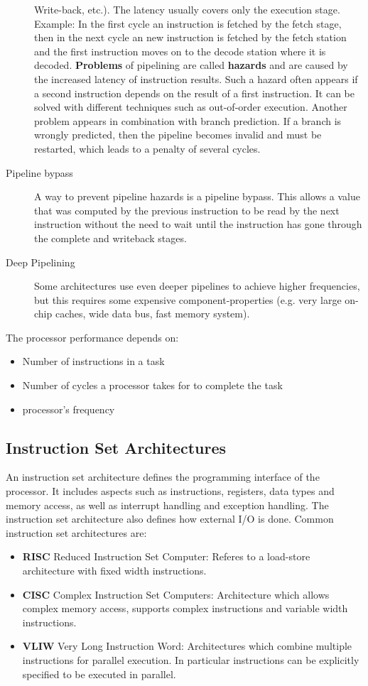 \documentclass[a4paper,10pt]{article}
\begin{document}
\begin{description}
Write-back, etc.)\cite{powerpc}. The latency usually covers only the execution stage. Example: In the first cycle an instruction is fetched by the
fetch stage, then in the next cycle an new instruction is fetched by the fetch station and the first instruction moves on to the decode
station where it is decoded. \textbf{Problems} of pipelining are called \textbf{hazards} and are caused by the increased latency of
instruction results. Such a hazard often appears if a second instruction depends on the result of a first instruction. It can be solved
with different techniques such as out-of-order execution. Another problem appears in combination with branch prediction. If a branch is
wrongly predicted, then the pipeline becomes invalid and must be restarted, which leads to a penalty of several cycles.
\item[Pipeline bypass] A way to prevent pipeline hazards is a pipeline bypass. This allows a value that was computed by the
previous instruction to be read by the next instruction without the need to wait until the instruction has gone through the complete and
writeback stages.
\item[Deep Pipelining] Some architectures use even deeper pipelines to achieve higher frequencies, but this requires some expensive
component-properties (e.g.  very large on-chip caches, wide data bus, fast memory system)\cite{powerpc}.
\end{description}


The processor performance depends on\cite{powerpc}:
\begin{itemize}
\item Number of instructions in a task
\item Number of cycles a processor takes for to complete the task
\item processor's frequency
\end{itemize}


\subsection{Instruction Set Architectures}
An instruction set architecture defines the programming interface of the processor. It includes aspects such as instructions, registers,
data types and memory access, as well as interrupt handling and exception handling. The instruction set architecture also defines how
external I/O is done. Common instruction set architectures are:
\begin{itemize}
 \item \textbf{RISC} Reduced Instruction Set Computer: Referes to a load-store architecture with fixed width instructions.
 \item \textbf{CISC} Complex Instruction Set Computers: Architecture which allows complex memory access, supports complex instructions
       and variable width instructions.
 \item \textbf{VLIW} Very Long Instruction Word: Architectures which combine multiple instructions for parallel execution. In particular
       instructions can be explicitly specified to be executed in parallel.
\end{itemize}
\end{document}
